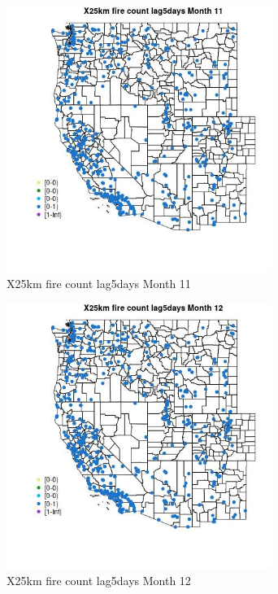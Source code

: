 \begin{figure} 
\centering  
\includegraphics[width=0.77\textwidth]{Code_Outputs/Report_ML_input_PM25_Step4_part_e_de_duplicated_aves_compiled_2019-05-14wNAs_MapObsMo11X25km_fire_count_lag5days.jpg} 
\caption{\label{fig:Report_ML_input_PM25_Step4_part_e_de_duplicated_aves_compiled_2019-05-14wNAsMapObsMo11X25km_fire_count_lag5days}X25km fire count lag5days Month 11} 
\end{figure} 
 

\begin{figure} 
\centering  
\includegraphics[width=0.77\textwidth]{Code_Outputs/Report_ML_input_PM25_Step4_part_e_de_duplicated_aves_compiled_2019-05-14wNAs_MapObsMo12X25km_fire_count_lag5days.jpg} 
\caption{\label{fig:Report_ML_input_PM25_Step4_part_e_de_duplicated_aves_compiled_2019-05-14wNAsMapObsMo12X25km_fire_count_lag5days}X25km fire count lag5days Month 12} 
\end{figure} 
 

